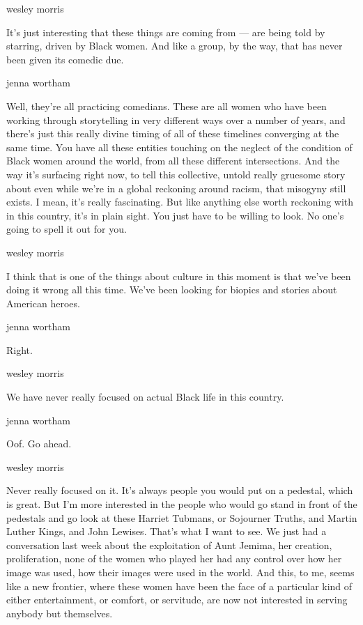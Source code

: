 wesley morris

It's just interesting that these things are coming from --- are being
told by starring, driven by Black women. And like a group, by the way,
that has never been given its comedic due.

jenna wortham

Well, they're all practicing comedians. These are all women who have
been working through storytelling in very different ways over a number
of years, and there's just this really divine timing of all of these
timelines converging at the same time. You have all these entities
touching on the neglect of the condition of Black women around the
world, from all these different intersections. And the way it's
surfacing right now, to tell this collective, untold really gruesome
story about even while we're in a global reckoning around racism, that
misogyny still exists. I mean, it's really fascinating. But like
anything else worth reckoning with in this country, it's in plain sight.
You just have to be willing to look. No one's going to spell it out for
you.

wesley morris

I think that is one of the things about culture in this moment is that
we've been doing it wrong all this time. We've been looking for biopics
and stories about American heroes.

jenna wortham

Right.

wesley morris

We have never really focused on actual Black life in this country.

jenna wortham

Oof. Go ahead.

wesley morris

Never really focused on it. It's always people you would put on a
pedestal, which is great. But I'm more interested in the people who
would go stand in front of the pedestals and go look at these Harriet
Tubmans, or Sojourner Truths, and Martin Luther Kings, and John Lewises.
That's what I want to see. We just had a conversation last week about
the exploitation of Aunt Jemima, her creation, proliferation, none of
the women who played her had any control over how her image was used,
how their images were used in the world. And this, to me, seems like a
new frontier, where these women have been the face of a particular kind
of either entertainment, or comfort, or servitude, are now not
interested in serving anybody but themselves.

